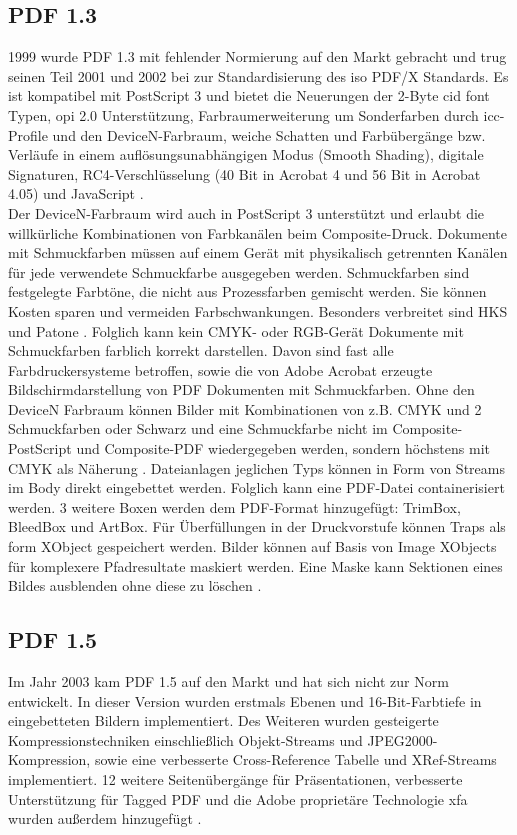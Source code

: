 \subsection{PDF 1.3}
1999 wurde PDF 1.3 mit fehlender Normierung auf den Markt gebracht und trug seinen Teil 2001 und 2002 bei zur Standardisierung des \gls{iso} PDF/X Standards. Es ist kompatibel mit PostScript 3 und bietet die Neuerungen der 2-Byte \gls{cid} font Typen, \gls{opi} 2.0 Unterstützung, Farbraumerweiterung um Sonderfarben durch \gls{icc}-Profile und den DeviceN-Farbraum, weiche Schatten und Farbübergänge bzw. Verläufe in einem auflösungsunabhängigen Modus (Smooth Shading), digitale Signaturen, RC4-Verschlüsselung (40 Bit in Acrobat 4 und 56 Bit in Acrobat 4.05) und JavaScript \cite{proj-consult, schneeberger}. \\ 
Der DeviceN-Farbraum wird auch in PostScript 3 unterstützt und erlaubt die willkürliche Kombinationen von Farbkanälen beim Composite-Druck. Dokumente mit Schmuckfarben müssen auf einem Gerät mit physikalisch getrennten Kanälen für jede verwendete Schmuckfarbe ausgegeben werden. Schmuckfarben sind festgelegte Farbtöne, die nicht aus Prozessfarben gemischt werden. Sie können Kosten sparen und vermeiden Farbschwankungen. Besonders verbreitet sind HKS und Patone \cite{kompendium}. Folglich kann kein CMYK- oder RGB-Gerät Dokumente mit Schmuckfarben farblich korrekt darstellen. Davon sind fast alle Farbdruckersysteme betroffen, sowie die von Adobe Acrobat erzeugte Bildschirmdarstellung von PDF Dokumenten mit Schmuckfarben. Ohne den DeviceN Farbraum können Bilder mit Kombinationen von z.B. CMYK und 2 Schmuckfarben oder Schwarz und eine Schmuckfarbe nicht im Composite-PostScript und Composite-PDF wiedergegeben werden, sondern höchstens mit CMYK als Näherung \cite{helios}. 
Dateianlagen jeglichen Typs können in Form von Streams im Body direkt eingebettet werden. Folglich kann eine PDF-Datei containerisiert werden. 3 weitere Boxen werden dem PDF-Format hinzugefügt: TrimBox, BleedBox und ArtBox. Für Überfüllungen in der Druckvorstufe können Traps als form XObject gespeichert werden. Bilder können auf Basis von Image XObjects für komplexere Pfadresultate maskiert werden. Eine Maske kann Sektionen eines Bildes ausblenden ohne diese zu löschen \cite{schneeberger}.


\subsection{PDF 1.5}
Im Jahr 2003 kam PDF 1.5 auf den Markt und hat sich nicht zur Norm entwickelt. In dieser Version wurden erstmals Ebenen und 16-Bit-Farbtiefe in eingebetteten Bildern implementiert. Des Weiteren wurden gesteigerte Kompressionstechniken einschließlich Objekt-Streams und JPEG2000-Kompression, sowie eine verbesserte Cross-Reference Tabelle und XRef-Streams implementiert. 12 weitere Seitenübergänge für Präsentationen, verbesserte Unterstützung für Tagged PDF und die Adobe proprietäre Technologie \gls{xfa} wurden außerdem hinzugefügt \cite{proj-consult, schneeberger}. 

